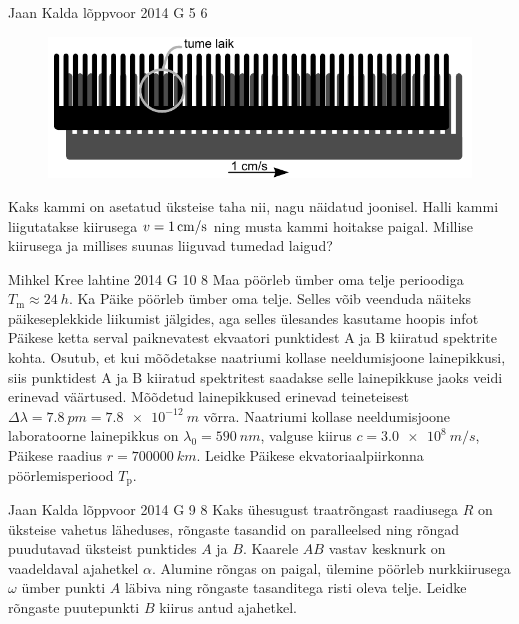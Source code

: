 \documentclass[11pt, twoside]{article}
\begin{document}
{%
{Jaan Kalda} %
{lõppvoor} %
{2014} %
{G 5} %
{6} %
{
\ifStatement
\begin{figure}%
\includegraphics[width=1\linewidth]{2014-v3g-05-kammid}
\end{figure}

Kaks kammi on asetatud üksteise taha nii, nagu näidatud joonisel. Halli kammi liigutatakse kiirusega $v=\SI 1{cm/s}$ ning musta kammi hoitakse paigal. Millise kiirusega ja millises suunas liiguvad tumedad laigud?
\fi
}

{Mihkel Kree} %
{lahtine} %
{2014} %
{G 10} %
{8} %
{
\ifStatement
Maa pöörleb ümber oma telje perioodiga $T_\text{m}\approx\SI{24}{h}$. Ka Päike pöörleb ümber oma telje. Selles võib veenduda näiteks päikeseplekkide liikumist jälgides, aga selles ülesandes kasutame hoopis infot Päikese ketta serval paiknevatest ekvaatori punktidest A ja B kiiratud spektrite kohta. Osutub, et kui mõõdetakse naatriumi kollase neeldumisjoone lainepikkusi, siis punktidest A ja B kiiratud spektritest saadakse selle lainepikkuse jaoks veidi erinevad väärtused. Mõõdetud lainepikkused erinevad teineteisest $\Delta \lambda = \SI{7.8}{pm}=\SI{7.8e-12}{m}$ võrra. Naatriumi kollase neeldumisjoone laboratoorne lainepikkus on $\lambda_0=\SI{590}{nm}$, valguse kiirus $c=\SI{3.0e8}{m/s}$, Päikese raadius $r=\SI{700000}{km}$. Leidke Päikese ekvatoriaalpiirkonna pöörlemisperiood $T_\text{p}$.
\fi
}

{Jaan Kalda} %
{lõppvoor} %
{2014} %
{G 9} %
{8} %
{
\ifStatement
Kaks ühesugust traatrõngast raadiusega $R$ on üksteise vahetus läheduses, rõngaste tasandid on paralleelsed ning rõngad puudutavad üksteist punktides $A$ ja $B$. Kaarele $AB$ vastav kesknurk on vaadeldaval ajahetkel $\alpha$. Alumine rõngas on paigal, ülemine pöörleb nurkkiirusega $\omega$ ümber punkti $A$ läbiva ning rõngaste tasanditega risti oleva telje. Leidke rõngaste puutepunkti $B$ kiirus antud ajahetkel.
\fi
}

}
\end{document}
